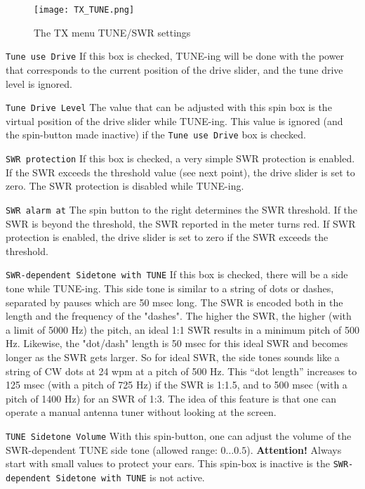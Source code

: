 \documentclass[12pt]{book}
\def\rett#1{\texttt{\color{red}#1}}
\begin{document}
\begin{figure}[ht]
\center
\texttt{[image: TX\_TUNE.png]}
\caption{The TX menu TUNE/SWR settings}
\label{fig:TXTUNEMenu}
\end{figure}

\rett{Tune use Drive} If this box is checked, TUNE-ing will be done with the power that corresponds to the
current position of the drive slider, and the tune drive level is ignored.

\rett{Tune Drive Level} The value that can be adjusted with this spin box is the virtual position of the
drive slider while TUNE-ing. This value is ignored (and the spin-button made inactive)
if the \rett{Tune use Drive} box is checked.

\rett{SWR protection} If this box is checked, a very simple SWR protection is enabled. If the SWR exceeds
the threshold value (see next point), the drive slider is set to zero. The SWR protection is disabled
while TUNE-ing.

\rett{SWR alarm at} The spin button to the right determines the SWR threshold. If the SWR is beyond the
threshold, the SWR reported in the meter turns red. If SWR protection is enabled, the drive slider is set to
zero if the SWR exceeds the threshold.

\rett{SWR-dependent Sidetone with TUNE} If this box is checked, there will be a side tone while TUNE-ing.
This side tone is similar to a string of dots or dashes, separated by pauses which are 50 msec long.
The SWR is encoded both in the length and the frequency of the "dashes".  The higher
the SWR, the higher (with a limit of 5000 Hz) the pitch, an ideal 1:1 SWR results in a minimum pitch
of 500 Hz. Likewise, the "dot/dash" length is 50 msec for this ideal SWR and becomes longer as the SWR
gets larger. So for ideal SWR, the side tones sounds like a string of CW dots at 24 wpm at a pitch of
500 Hz. This ``dot length'' increases to 125 msec (with a pitch of 725 Hz) if the SWR is 1:1.5,
and to 500 msec (with a pitch of 1400 Hz) for an SWR of 1:3. The idea of
this feature is that one can operate a manual antenna tuner without looking at the screen.

\rett{TUNE Sidetone Volume} With this spin-button, one can adjust the volume of the SWR-dependent TUNE side tone
(allowed range: $0 \ldots 0.5$). \textbf{Attention!} Always start with small values to protect your ears.
This spin-box is inactive is the \rett{SWR-dependent Sidetone with TUNE} is not active.

\clearpage
\end{document}
